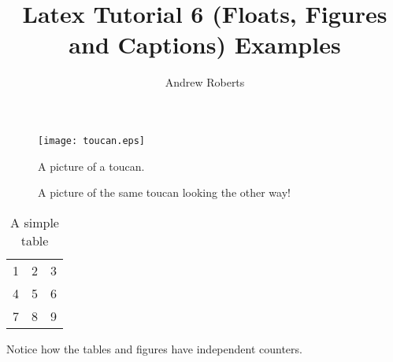\documentclass[12pt,oneside]{article}
\begin{document}
 
\title{Latex Tutorial 6 (Floats, Figures and Captions) Examples}
\author{Andrew Roberts}
\maketitle
 
\begin{figure}[!htp]
  \caption{A picture of a toucan.}
  \begin{center}
    \texttt{[image: toucan.eps]}
  \end{center}
\end{figure}
 
\begin{figure}[hbp]
  \begin{center}
  \end{center}
  \caption{A picture of the same toucan looking the other way!}
\end{figure}
 
\begin{table}[htp]
  \begin{center}
    \begin{tabular}{| l c r |}
    \hline
    1 & 2 & 3 \\
    4 & 5 & 6 \\
    7 & 8 & 9 \\
    \hline
    \end{tabular}
  \end{center}
  \caption{A simple table}
\end{table}
 
Notice how the tables and figures have independent counters.
 
\end{document}

